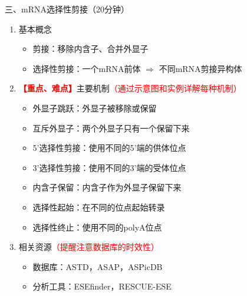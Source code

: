 \documentclass{TIJMUjiaoanLL}
\begin{document}
\vspace*{0.2cm}
\noindent
三、mRNA选择性剪接（20分钟）
\begin{enumerate}
  \item 基本概念
    \begin{itemize}
      \item 剪接：移除内含子、合并外显子
      \item 选择性剪接：一个mRNA前体 $\Rightarrow$ 不同mRNA剪接异构体
    \end{itemize}
  \item \textcolor{red}{\textbf{【重点、难点】}}主要机制\textcolor{red}{（通过示意图和实例详解每种机制）}
    \begin{itemize}
      \item 外显子跳跃：外显子被移除或保留
      \item 互斥外显子：两个外显子只有一个保留下来
      \item 5'选择性剪接：使用不同的5'端的供体位点
      \item 3'选择性剪接：使用不同的3'端的受体位点
      \item 内含子保留：内含子作为外显子保留下来
      \item 选择性起始：在不同的位点起始转录
      \item 选择性终止：使用不同的polyA位点
    \end{itemize}
  \item 相关资源\textcolor{red}{（提醒注意数据库的时效性）}
    \begin{itemize}
      \item 数据库：ASTD，ASAP，ASPicDB
      \item 分析工具：ESEfinder，RESCUE-ESE
    \end{itemize}
\end{enumerate}


\otherTail
\newpage
\otherHeader
\end{document}
